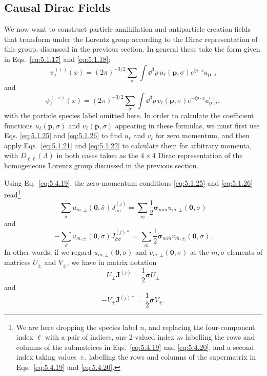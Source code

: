 
\subsection{Causal Dirac Fields}

We now want to construct particle annihilation and antiparticle creation fields
that transform under the Lorentz group according to the Dirac representation
of this group, discussed in the previous section. In general these take the
form given in Eqs.~\eqref{eq:5.1.17} and \eqref{eq:5.1.18}:
\begin{equation}
\psi_\ell^{(+)}(x)=(2\pi)^{-3/2}\sum_\sigma\int \dd^3p\,
u_\ell(\mathbf p,\sigma)e^{\ii p\cdot x}a_{\mathbf p,\sigma}
\tag{5.5.1}\label{eq:5.5.1}
\end{equation}
and
\begin{equation}
\psi_\ell^{(-c)}(x)=(2\pi)^{-3/2}\sum_\sigma\int \dd^3p\,
v_\ell(\mathbf p,\sigma)e^{-\ii p\cdot x}a^{c\dagger}_{\mathbf p,\sigma},
\tag{5.5.2}\label{eq:5.5.2}
\end{equation}
with the particle species label omitted here. In order to calculate the
coefficient functions $u_\ell(\mathbf p,\sigma)$ and
$v_\ell(\mathbf p,\sigma)$ appearing in these formulas, we must first use Eqs.
\eqref{eq:5.1.25} and \eqref{eq:5.1.26} to find $u_\ell$ and $v_\ell$ for zero momentum, and then
apply Eqs.~\eqref{eq:5.1.21} and \eqref{eq:5.1.22} to calculate them for arbitrary momenta, with
$D_{\ell\bar\ell}(\Lambda)$ in both cases taken as the $4\times4$ Dirac
representation of the homogeneous Lorentz group discussed in the previous
section.

Using Eq.~\eqref{eq:5.4.19}, the zero-momentum conditions \eqref{eq:5.1.25} and \eqref{eq:5.1.26}
read\footnote{We are here dropping the species label $n$, and replacing the
four-component index $\ell$ with a pair of indices, one 2-valued index $m$
labelling the rows and columns of the submatrices in Eqs.~\eqref{eq:5.4.19} and
\eqref{eq:5.4.20}, and a second index taking values $\mathord\pm$, labelling the rows
and columns of the supermatrix in Eqs.~\eqref{eq:5.4.19} and \eqref{eq:5.4.20}.}
\[
\sum_{\bar\sigma}u_{m,\pm}(\mathbf0,\bar\sigma)
J^{(j)}_{\bar\sigma\sigma}
=\sum_{\bar m}\frac12\boldsymbol{\sigma}_{m\bar m}
u_{\bar m,\pm}(\mathbf0,\sigma)
\]
and
\[
-\sum_{\bar\sigma}v_{m,\pm}(\mathbf0,\bar\sigma)
J^{(j)*}_{\bar\sigma\sigma}
=\sum_{\bar m}\frac12\boldsymbol{\sigma}_{m\bar m}
v_{\bar m,\pm}(\mathbf0,\sigma).
\]
In other words, if we regard $u_{m,\pm}(\mathbf0,\sigma)$ and
$v_{m,\pm}(\mathbf0,\sigma)$ as the $m,\sigma$ elements of matrices $U_\pm$
and $V_\pm$, we have in matrix notation
\begin{equation}
U_\pm\mathbf J^{(j)}=\frac12\boldsymbol{\sigma}U_\pm
\tag{5.5.3}\label{eq:5.5.3}
\end{equation}
and
\begin{equation}
-V_\pm\mathbf J^{(j)*}=\frac12\boldsymbol{\sigma}V_\pm.
\tag{5.5.4}\label{eq:5.5.4}
\end{equation}

